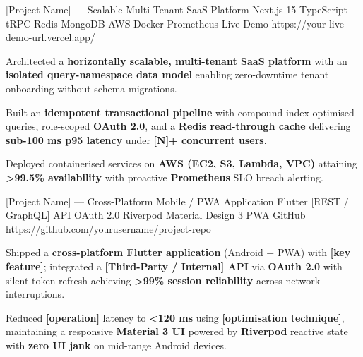 \documentclass{bhaumic}
\begin{document}
\begin{samepage}
\projentry
  {[Project Name] — Scalable Multi-Tenant SaaS Platform}
  {Next.js 15 \textbullet{} TypeScript \textbullet{} tRPC \textbullet{} Redis \textbullet{} MongoDB \textbullet{} AWS \textbullet{} Docker \textbullet{} Prometheus}
  {Live Demo}
  {https://your-live-demo-url.vercel.app/}
  {
    \begin{resbullets}
      \item Architected a \textbf{horizontally scalable, multi-tenant SaaS platform}
            with an \textbf{isolated query-namespace data model} enabling zero-downtime
            tenant onboarding without schema migrations.

      \item Built an \textbf{idempotent transactional pipeline} with compound-index-optimised
            queries, role-scoped \textbf{OAuth 2.0}, and a \textbf{Redis read-through cache}
            delivering \textbf{sub-100 ms p95 latency} under \textbf{[N]+ concurrent users}.

      \item Deployed containerised services on \textbf{AWS (EC2, S3, Lambda, VPC)}
            attaining \textbf{\textgreater 99.5\% availability} with proactive
            \textbf{Prometheus} SLO breach alerting.
    \end{resbullets}
  }
\end{samepage}

\begin{samepage}
\projentry
  {[Project Name] — Cross-Platform Mobile / PWA Application}
  {Flutter \textbullet{} [REST / GraphQL] API \textbullet{} OAuth 2.0 \textbullet{} Riverpod \textbullet{} Material Design 3 \textbullet{} PWA}
  {GitHub}
  {https://github.com/yourusername/project-repo}
  {
    \begin{resbullets}
      \item Shipped a \textbf{cross-platform Flutter application} (Android + PWA) with
            \textbf{[key feature]}; integrated a \textbf{[Third-Party / Internal] API}
            via \textbf{OAuth 2.0} with silent token refresh achieving
            \textbf{\textgreater 99\% session reliability} across network interruptions.

      \item Reduced \textbf{[operation]} latency to \textbf{\textless 120 ms} using
            \textbf{[optimisation technique]}, maintaining a responsive
            \textbf{Material 3 UI} powered by \textbf{Riverpod} reactive state
            with \textbf{zero UI jank} on mid-range Android devices.
    \end{resbullets}
  }
\end{samepage}
\end{document}
